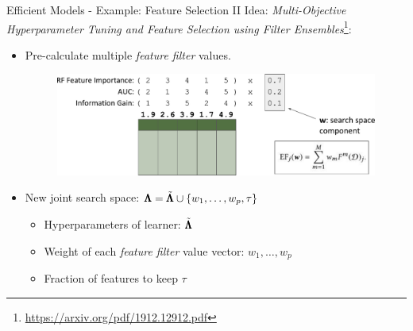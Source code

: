 \begin{frame}{Efficient Models - Example: Feature Selection II}
Idea: \emph{Multi-Objective Hyperparameter Tuning and Feature Selection  using Filter Ensembles}\footnote{\url{https://arxiv.org/pdf/1912.12912.pdf}}:

  \begin{itemize}
    \item Pre-calculate multiple \emph{feature filter} values.
    
    \begin{figure}
      \centering
      \includegraphics[width = 0.7\linewidth]{images/mosmafs_presentation_p39.pdf}
    \end{figure}

    \item New joint search space: $\pmb{\Lambda} = \tilde{\pmb{\Lambda}} \cup \{w_1, \ldots, w_p ,\tau \}$
    \begin{itemize}
      \item Hyperparameters of learner: $\tilde{\pmb{\Lambda}}$
      \item Weight of each \emph{feature filter} value vector: $w_1, \ldots, w_p$
      \item Fraction of features to keep $\tau$
    \end{itemize}
    
  \end{itemize}  

\end{frame}

